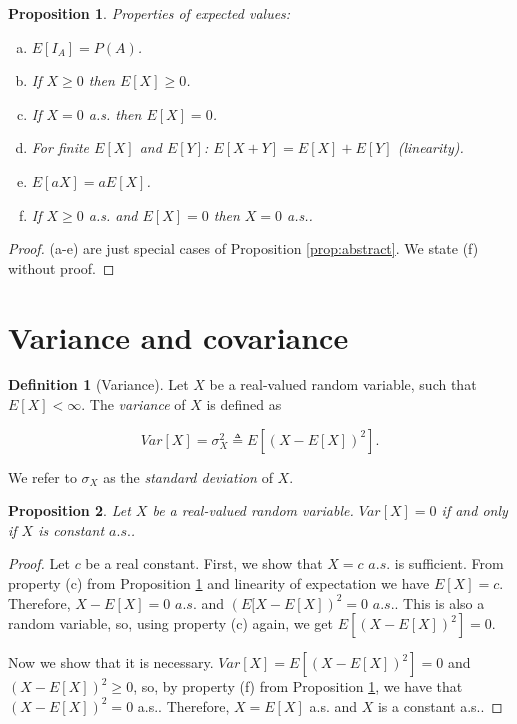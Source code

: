 \documentclass{book}
\theoremstyle{plain}%
\newtheorem{proposition}{Proposition}[section]
\theoremstyle{definition}
\newtheorem{definition}{Definition}[section]
\begin{document}
\begin{proposition}

Properties of expected values:

\begin{enumerate}[(a)]
\item $E[I_A] = P(A)$.
\item If $X \geq 0$ then $E[X] \geq 0$.
\item If $X = 0$ a.s. then $E[X] = 0$.
\item For finite $E[X]$ and $E[Y]$: $E[X+Y] = E[X] + E[Y]$ \emph{(linearity)}.
\item $E[aX] = aE[X]$.
\item If $X \geq 0$ a.s. and $E[X] = 0$ then $X = 0$ a.s..
\end{enumerate}\label{prop:properties_of_expectation}
\end{proposition}

\begin{proof}
(a-e) are just special cases of Proposition \ref{prop:abstract}. We state (f) without proof.
\end{proof}


\section{Variance and covariance}

\begin{definition}[Variance] Let $X$ be a real-valued random variable, such that $E[X] < \infty$.  The \emph{variance} of $X$ is defined as

$$Var[X] = \sigma^2_{X} \triangleq E[(X - E[X])^2].$$

We refer to $\sigma_X$ as the\emph{ standard deviation} of $X$.
\end{definition}

\begin{proposition}
Let $X$ be a real-valued random variable. $Var[X] = 0$ if and only if $X$ is constant $a.s.$.
\end{proposition}

\begin{proof}
Let $c$ be a real constant. First, we show that $X = c$ $a.s.$ is sufficient. From property (c) from Proposition \ref{prop:properties_of_expectation} and linearity of expectation we have $E[X] = c$. Therefore, $X - E[X] = 0$ $a.s.$ and $(E[X - E[X])^2 = 0$ $a.s.$. This is also a random variable, so, using property (c) again, we get $E[(X - E[X])^2] = 0$.

Now we show that it is necessary. $Var[X] = E[(X - E[X])^2] = 0$ and $(X - E[X])^2 \geq 0$, so, by property (f) from Proposition \ref{prop:properties_of_expectation}, we have that $(X - E[X])^2 = 0$ a.s.. Therefore, $X = E[X]$ a.s. and $X$ is a constant a.s..
\end{proof}
\end{document}
